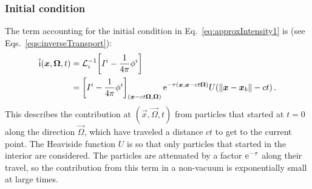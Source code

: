 \subsubsection{Initial condition}\label{sec:derIc}
The term accounting for the initial condition in
Eq.~\eqref{eq:approxIntensity1} is (see Eqs.~\eqref{eqs:inverseTransport}):
\begin{align*}
  \mathrm{ \tilde i }(\bm{x}, \bm{\Omega}, t) &=
    \mathcal{L}_{i}^{-1}\!\left[I^i - \frac1{4\pi} \phi^i\right]
  \\
  &= \left[ I^i - \frac1{4\pi} \phi^i \right]_{( \bm{x} - ct
  \bm{\Omega}, \bm{\Omega})}
    \mathop{}\!\mathrm{e}^{ -\tau(\bm{x}, \bm{x} - ct \bm{\Omega})}
    U( \left\| \bm{x} - \bm{x}_b \right\| - ct)\,.
\end{align*}
This describes the contribution at $(\vec{x}, \vec{\Omega}, t)$ from particles
that started at $t=0$ along the direction $\vec{\Omega}$, which have
traveled a distance $ct$ to get to the current point. The Heaviside function
$U$ is so that only particles that started in the interior are considered. The
particles are attenuated by a factor $\mathop{}\!\mathrm{e}^{ -\tau}$ along their travel, so
the contribution from this term in a non-vacuum is exponentially small at large
times.

